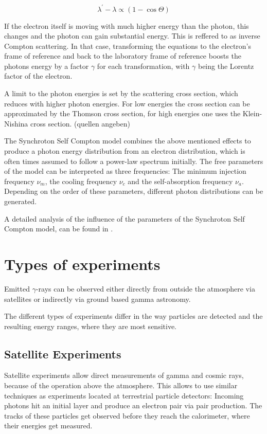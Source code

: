 \begin{equation}
	\lambda^{\prime} - \lambda  \propto \left(1-\cos{\Theta} \right)
	\label{eq:compton}
\end{equation}

If the electron itself is moving with much higher energy
than the photon, this changes and the photon can gain substantial energy.
This is reffered to as inverse Compton scattering.
In that case, transforming the equations to the 
electron's frame of reference and back to the laboratory frame of reference
boosts the photons energy by a factor $\gamma$ for each transformation, 
with $\gamma$ being the Lorentz factor of the electron.

A limit to the photon energies is set by the scattering cross
section, which reduces with higher photon energies.
For low energies the cross section can be approximated by 
the Thomson cross section, for high energies
one uses the Klein-Nishina cross section. (quellen angeben)

The Synchroton Self Compton model combines the above mentioned
effects to produce a photon energy distribution from an
electron distribution, which is often times assumed to
follow a power-law spectrum initially.
The free parameters of the model can be interpreted as 
three frequencies: The minimum injection frequency $\nu_m$, 
the cooling frequency $\nu_c$ and the self-absorption frequency $\nu_a$.
Depending on the order of these parameters, different 
photon distributions can be generated.

A detailed analysis of the influence of the parameters of
the Synchroton Self Compton model, can be found in 
\cite{10.1093/mnras/stt1461}.


\section{Types of experiments}
Emitted $\gamma$-rays can be observed either directly
from outside the atmosphere via satellites or indirectly
via ground based gamma astronomy.

The different types of experiments differ in the way particles are detected and
the resulting energy ranges, where they are most sensitive.

\subsection{Satellite Experiments}
Satellite experiments allow direct measurements of gamma and cosmic rays, because of the operation
above the atmosphere.
This allows to use similar techniques as experiments located at terrestrial 
particle detectors: Incoming photons hit an initial layer and produce an electron pair 
via pair production. The tracks of these particles get observed before they reach the calorimeter,
where their energies get measured.

